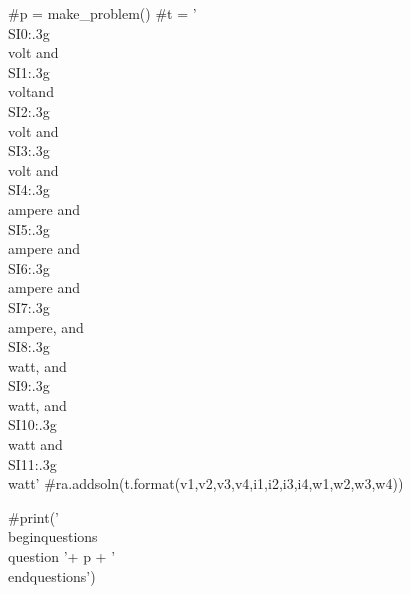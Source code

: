 \documentclass[12pt]{exam}
\begin{document}
\begin{pycode}
#p = make_problem()
#t = '\\SI{{{0:.3g}}}{{\\volt}} and \\SI{{{1:.3g}}}{{\\volt}}and \\SI{{{2:.3g}}}{{\\volt}} and \\SI{{{3:.3g}}}{{\\volt}} and \\SI{{{4:.3g}}}{{\\ampere}} and \\SI{{{5:.3g}}}{{\\ampere}} and \\SI{{{6:.3g}}}{{\\ampere}} and \\SI{{{7:.3g}}}{{\\ampere}}, and \\SI{{{8:.3g}}}{{\\watt}}, and \\SI{{{9:.3g}}}{{\\watt}}, and \\SI{{{10:.3g}}}{{\\watt}} and \\SI{{{11:.3g}}}{{\\watt}}'
#ra.addsoln(t.format(v1,v2,v3,v4,i1,i2,i3,i4,w1,w2,w3,w4))

#print('\\begin{questions}\\question '+ p + '\\end{questions}')

\end{pycode}


	
\end{document}
